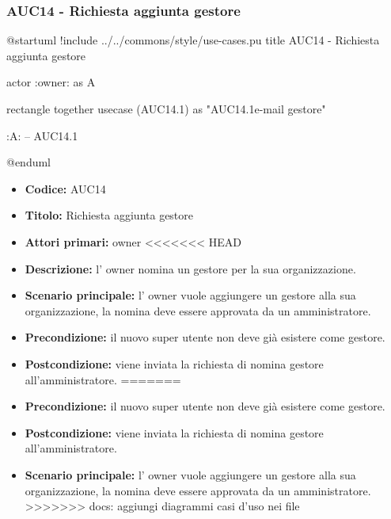 \documentclass[casi-duso]{subfiles}
\begin{document}
\subsubsection{AUC14 - Richiesta aggiunta gestore}%
\label{subsub:AUC14}

\begin{plantuml}
@startuml
!include ../../commons/style/use-cases.pu
title AUC14 - Richiesta aggiunta gestore

actor :owner: as A

rectangle {
  together {
    usecase (AUC14.1) as "AUC14.1\nInserimento e-mail gestore"
  }
}

:A: -- AUC14.1

@enduml
\end{plantuml}

\begin{itemize}
  \item \textbf{Codice:} AUC14
  \item \textbf{Titolo:} Richiesta aggiunta gestore
  \item \textbf{Attori primari:} owner
<<<<<<< HEAD
  \item \textbf{Descrizione:} l' owner nomina un gestore per la sua organizzazione.
  \item \textbf{Scenario principale:} l' owner vuole aggiungere un gestore alla sua organizzazione, la nomina deve essere approvata da un amministratore.
  \item \textbf{Precondizione:} il nuovo super utente non deve già esistere come gestore.
  \item \textbf{Postcondizione:} viene inviata la richiesta di nomina gestore all'amministratore.
=======
  \item \textbf{Precondizione:} il nuovo super utente non deve già esistere come gestore.
  \item \textbf{Postcondizione:} viene inviata la richiesta di nomina gestore all'amministratore.
  \item \textbf{Scenario principale:} l' owner vuole aggiungere un gestore alla sua organizzazione, la nomina deve essere approvata da un 
  amministratore.
>>>>>>> docs: aggiungi diagrammi casi d'uso nei file
\end{itemize}
\end{document}
